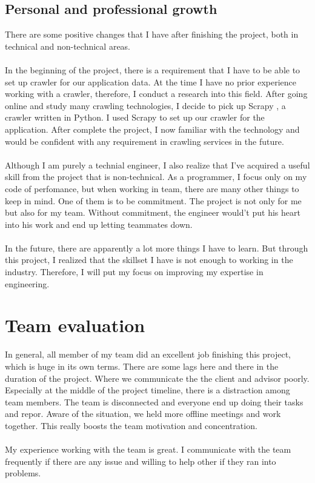 \subsection{Personal and professional growth}
There are some positive changes that I have after finishing the project, both in technical and non-technical areas.
\\
\\
In the beginning of the project, there is a requirement that I have to be able to set up crawler for our application data. At the time I have no prior experience working with a crawler, therefore, I conduct a research into this field. After going online and study many crawling technologies, I decide to pick up Scrapy \cite{scrapy}, a crawler written in Python. I used Scrapy to set up our crawler for the application. After complete the project, I now familiar with the technology and would be confident with any requirement in crawling services in the future.
\\
\\
Although I am purely a technial engineer, I also realize that I've acquired a useful skill from the project that is non-technical. As a programmer, I focus only on my code of perfomance, but when working in team, there are many other things to keep in mind. One of them is to be commitment. The project is not only for me but also for my team. Without commitment, the engineer would't put his heart into his work and end up letting teammates down.
\\
\\
In the future, there are apparently a lot more things I have to learn. But through this project, I realized that the skillset I have is not enough to working in the industry. Therefore, I will put my focus on improving my expertise in engineering.
\section{Team evaluation}
In general, all member of my team did an excellent job finishing this project, which is huge in its own terms. There are some lags here and there in the duration of the project. Where we communicate the the client and advisor poorly. Especially at the middle of the project timeline, there is a distraction among team members. The team is disconnected and everyone end up doing their tasks and repor. Aware of the situation, we held more offline meetings and work together. This really boosts the team motivation and concentration. 
\\
\\
My experience working with the team is great. I communicate with the team frequently if there are any issue and willing to help other if they ran into problems.